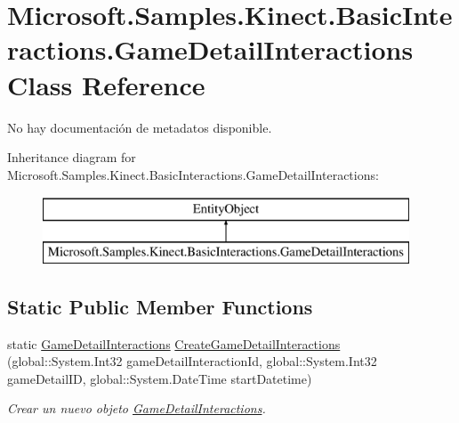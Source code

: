 \hypertarget{class_microsoft_1_1_samples_1_1_kinect_1_1_basic_interactions_1_1_game_detail_interactions}{\section{Microsoft.\-Samples.\-Kinect.\-Basic\-Interactions.\-Game\-Detail\-Interactions Class Reference}
\label{class_microsoft_1_1_samples_1_1_kinect_1_1_basic_interactions_1_1_game_detail_interactions}
}


No hay documentación de metadatos disponible.  


Inheritance diagram for Microsoft.\-Samples.\-Kinect.\-Basic\-Interactions.\-Game\-Detail\-Interactions\-:\begin{figure}[H]
\begin{center}
\leavevmode
\includegraphics[height=2.000000cm]{class_microsoft_1_1_samples_1_1_kinect_1_1_basic_interactions_1_1_game_detail_interactions}
\end{center}
\end{figure}
\subsection*{Static Public Member Functions}
\begin{DoxyCompactItemize}
\item 
static \hyperlink{class_microsoft_1_1_samples_1_1_kinect_1_1_basic_interactions_1_1_game_detail_interactions}{Game\-Detail\-Interactions} \hyperlink{class_microsoft_1_1_samples_1_1_kinect_1_1_basic_interactions_1_1_game_detail_interactions_a34216ad5ed9e2d83a0b03b0117e10fcc}{Create\-Game\-Detail\-Interactions} (global\-::\-System.\-Int32 game\-Detail\-Interaction\-Id, global\-::\-System.\-Int32 game\-Detail\-I\-D, global\-::\-System.\-Date\-Time start\-Datetime)
\begin{DoxyCompactList}\small\item\em Crear un nuevo objeto \hyperlink{class_microsoft_1_1_samples_1_1_kinect_1_1_basic_interactions_1_1_game_detail_interactions}{Game\-Detail\-Interactions}. \end{DoxyCompactList}\end{DoxyCompactItemize}
